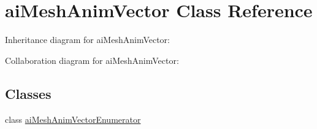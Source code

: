 \hypertarget{classai_mesh_anim_vector}{\section{ai\+Mesh\+Anim\+Vector Class Reference}
\label{classai_mesh_anim_vector}
}


Inheritance diagram for ai\+Mesh\+Anim\+Vector\+:


Collaboration diagram for ai\+Mesh\+Anim\+Vector\+:
\subsection*{Classes}
\begin{DoxyCompactItemize}
\item 
class \hyperlink{classai_mesh_anim_vector_1_1ai_mesh_anim_vector_enumerator}{ai\+Mesh\+Anim\+Vector\+Enumerator}
\end{DoxyCompactItemize}
